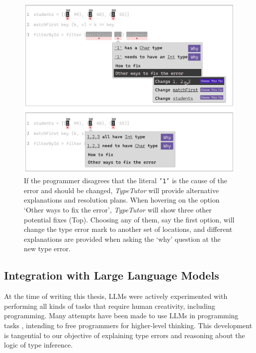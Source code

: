 \begin{figure}[hbt]
  \includegraphics[width=\linewidth]{WhatIf}
  \caption[An examples of \textit{TypeTutor} addressing alternative causes (`what-if' questions)]{
      \label{fig:what-if}
      If the programmer disagrees that the literal \texttt{'1'} is the cause of the error and should be changed, \textit{TypeTutor} will provide alternative explanations and resolution plans. When hovering on the option `Other ways to fix the error', \textit{TypeTutor} will show three other potential fixes (Top). Choosing any of them, say the first option, will change the type error mark to another set of locations, and different explanations are provided when asking the `why' question at the new type error.
    }
\end{figure}


\subsection*{Integration with Large Language Models}
At the time of writing this thesis, LLMs were actively experimented with performing all kinds of tasks that require human creativity, including programming. Many attempts have been made to use LLMs in programming tasks \cite{Shi2024-bj}, intending to free programmers for higher-level thinking. This development is tangential to our objective of explaining type errors and reasoning about the logic of type inference. 

